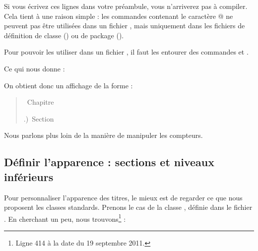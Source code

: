 \label{makeatletter}Si vous écrivez ces lignes dans votre préambule, vous n'arriverez pas à compiler. Cela tient à une raison simple : les commandes contenant le caractère @ ne peuvent pas être  utilisées dans un fichier , mais uniquement dans les fichiers de définition de classe () ou de package ().

Pour pouvoir les utiliser dans un fichier , il faut les entourer des commandes  et .

Ce qui nous donne : 

\begin{latexcode}
\makeatletter
\renewcommand \thechapter {\@Roman\c@chapter}
\renewcommand \thesection {\thechapter.\@arabic\c@section)}
\makeatother
\end{latexcode}


\makeatletter
\let\oldthechapter\thechapter
\let\oldthesection\thesection
\renewcommand \thechapter {\@Roman\c@chapter}
\renewcommand \thesection {\thechapter.\@arabic\c@section)}
\makeatother

On obtient donc un affichage de la forme :


\begin{quotation}
\thechapter~Chapitre 

\thesection~Section
\end{quotation}

\renewcommand{\thechapter}{\oldthechapter}
\renewcommand{\thesection}{\oldthesection}


\begin{plusloins}
Nous parlons plus loin de la manière de manipuler les compteurs.
\end{plusloins}

\subsection{Définir l'apparence : sections et niveaux inférieurs}\label{apparencetitre}

Pour personnaliser l'apparence des titres, le mieux est de regarder ce que nous proposent les classes standards. Prenons le cas de la classe , définie dans le fichier . En cherchant un peu, nous trouvons\footnote{Ligne 414 à la date du 19 septembre 2011.} :

\begin{latexcode}
\newcommand\section{\@startsection {section}{1}{\z@}%
                             {-3.5ex \@plus -1ex \@minus -.2ex}%
                             {2.3ex \@plus.2ex}%
                             {\normalfont\Large\bfseries}}
\end{latexcode}

